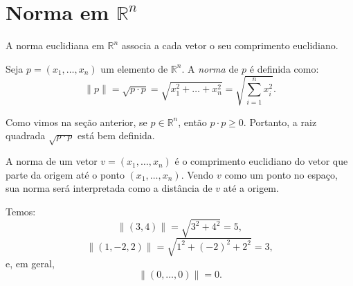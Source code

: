 \section{Norma em \texorpdfstring{$\mathbb R^n$}{Rn}}

A norma euclidiana em $\mathbb R^n$ associa a cada vetor o seu comprimento euclidiano.

\begin{definition}
    Seja $p=(x_1, \ldots, x_n)$ um elemento de $\mathbb R^n$.
    A \emph{norma} de $p$ é definida como:
    \begin{equation*}
        \|p\| = \sqrt{p\cdot p}=\sqrt{x_1^2 + \ldots + x_n^2} = \sqrt{\sum_{i=1}^n x_i^2}.
    \end{equation*}
\end{definition}

Como vimos na seção anterior, se $p\in\mathbb R^n$, então $p\cdot p\geq 0$.
Portanto, a raiz quadrada $\sqrt{p\cdot p}$ está bem definida.

A norma de um vetor $v=(x_1, \ldots, x_n)$ é o comprimento euclidiano do vetor que parte da origem até o ponto $(x_1, \ldots, x_n)$.
Vendo $v$ como um ponto no espaço, sua norma será interpretada como a distância de $v$ até a origem.

\begin{example}
    Temos:
    \[
        \|(3,4)\|=\sqrt{3^2+4^2}=5,
    \]
    \[
        \|(1,-2,2)\|=\sqrt{1^2+(-2)^2+2^2}=3,
    \]
    e, em geral,
    \[
        \|(0,\ldots,0)\|=0.
    \]
\end{example}

